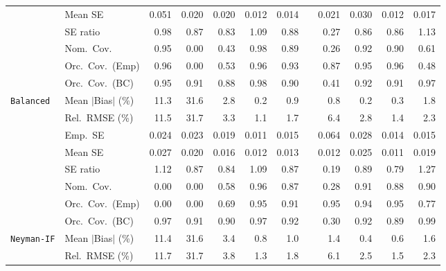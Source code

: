 \begin{landscape}
\begin{longtable}{llrrrrrrrrrr}
 & Mean SE & 0.051 & 0.020 & 0.020 & 0.012 & 0.014 &  & 0.021 & 0.030 & 0.012 & 0.017 \\
 & SE ratio & \cellcolor{rankone}0.98 & 0.87 & 0.83 & \cellcolor{ranktwo}1.09 & \cellcolor{rankthree}0.88 &  & 0.27 & 0.86 & 0.86 & 1.13 \\
 & Nom.\ Cov. & \cellcolor{rankone}0.95 & 0.00 & 0.43 & \cellcolor{ranktwo}0.98 & 0.89 &  & 0.26 & \cellcolor{rankthree}0.92 & 0.90 & 0.61 \\
 & Orc.\ Cov.\ (Emp) & \cellcolor{ranktwo}0.96 & 0.00 & 0.53 & \cellcolor{rankthree}0.96 & 0.93 &  & 0.87 & \cellcolor{rankone}0.95 & 0.96 & 0.48 \\
 & Orc.\ Cov.\ (BC) & \cellcolor{rankone}0.95 & 0.91 & 0.88 & 0.98 & 0.90 &  & 0.41 & \cellcolor{rankthree}0.92 & 0.91 & \cellcolor{ranktwo}0.97 \\
\addlinespace[2pt]
\quad \texttt{Balanced} & Mean $|$Bias$|$ (\%) & 11.3 & 31.6 & 2.8 & \cellcolor{ranktwo}0.2 & 0.9 &  & 0.8 & \cellcolor{rankone}0.2 & \cellcolor{rankthree}0.3 & 1.8 \\
 & Rel.\ RMSE (\%) & 11.5 & 31.7 & 3.3 & \cellcolor{rankone}1.1 & \cellcolor{rankthree}1.7 &  & 6.4 & 2.8 & \cellcolor{ranktwo}1.4 & 2.3 \\
 & Emp.\ SE & 0.024 & 0.023 & 0.019 & 0.011 & 0.015 &  & 0.064 & 0.028 & 0.014 & 0.015 \\
 & Mean SE & 0.027 & 0.020 & 0.016 & 0.012 & 0.013 &  & 0.012 & 0.025 & 0.011 & 0.019 \\
 & SE ratio & \cellcolor{rankthree}1.12 & 0.87 & 0.84 & \cellcolor{rankone}1.09 & 0.87 &  & 0.19 & \cellcolor{ranktwo}0.89 & 0.79 & 1.27 \\
 & Nom.\ Cov. & 0.00 & 0.00 & 0.58 & \cellcolor{rankone}0.96 & 0.87 &  & 0.28 & \cellcolor{ranktwo}0.91 & 0.88 & \cellcolor{rankthree}0.90 \\
 & Orc.\ Cov.\ (Emp) & 0.00 & 0.00 & 0.69 & \cellcolor{ranktwo}0.95 & 0.91 &  & \cellcolor{rankone}0.95 & 0.94 & \cellcolor{rankthree}0.95 & 0.77 \\
 & Orc.\ Cov.\ (BC) & \cellcolor{ranktwo}0.97 & 0.91 & 0.90 & \cellcolor{rankone}0.97 & \cellcolor{rankthree}0.92 &  & 0.30 & 0.92 & 0.89 & 0.99 \\
\addlinespace[2pt]
\quad \texttt{Neyman-IF} & Mean $|$Bias$|$ (\%) & 11.4 & 31.6 & 3.4 & \cellcolor{rankthree}0.8 & 1.0 &  & 1.4 & \cellcolor{rankone}0.4 & \cellcolor{ranktwo}0.6 & 1.6 \\
 & Rel.\ RMSE (\%) & 11.7 & 31.7 & 3.8 & \cellcolor{rankone}1.3 & \cellcolor{rankthree}1.8 &  & 6.1 & 2.5 & \cellcolor{ranktwo}1.5 & 2.3 \\

\end{longtable}
\end{landscape}
